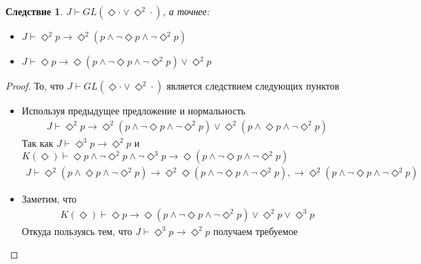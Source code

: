 \documentclass[12pt,a4paper,oneside]{article}
\newtheorem*{corollary}{Следствие}
\begin{document}
\begin{corollary}
$J \vdash  GL(\Diamond \cdot \vee  \Diamond ^2\cdot)$, а точнее:
\begin{itemize}
\item $J \vdash  \Diamond ^2 p \rightarrow  \Diamond ^2(p \wedge  \neg \Diamond p \wedge  \neg \Diamond ^2 p)$
\item $J \vdash  \Diamond  p \rightarrow  \Diamond (p \wedge  \neg \Diamond p \wedge  \neg \Diamond ^2 p) \vee  \Diamond ^2 p$
\end{itemize}
\end{corollary}
\begin{proof}
То, что $J \vdash  GL(\Diamond \cdot \vee  \Diamond ^2\cdot)$ является следствием следующих пунктов
\begin{itemize}
\item Используя предыдущее предложение и нормальность
\begin{align*}
J \vdash  \Diamond ^2 p \rightarrow  \Diamond ^2(p \wedge  \neg \Diamond p \wedge  \neg \Diamond ^2 p) \vee  \Diamond ^2(p \wedge  \Diamond p \wedge  \neg \Diamond ^2 p)
\end{align*}
Так как $J \vdash  \Diamond ^3 p \rightarrow  \Diamond ^2 p$ и $K(\Diamond ) \vdash  \Diamond p \wedge  \neg \Diamond ^2 p \wedge  \neg \Diamond ^3 p \rightarrow  \Diamond (p \wedge  \neg \Diamond p \wedge  \neg \Diamond ^2 p)$
\begin{align*}
J \vdash  \Diamond ^2(p \wedge  \Diamond p \wedge  \neg \Diamond ^2 p) \rightarrow  \Diamond ^2\Diamond (p \wedge  \neg \Diamond p \wedge  \neg \Diamond ^2 p), \rightarrow  \Diamond ^2(p \wedge  \neg \Diamond p \wedge  \neg \Diamond ^2 p)
\end{align*}
\item Заметим, что
\begin{align*}
K(\Diamond ) \vdash  \Diamond p \rightarrow  \Diamond (p \wedge  \neg \Diamond p \wedge  \neg \Diamond ^2 p) \vee  \Diamond ^2 p \vee  \Diamond ^3 p
\end{align*}
Откуда пользуясь тем, что $J \vdash  \Diamond ^3 p \rightarrow  \Diamond ^2 p$ получаем требуемое
\end{itemize}
\end{proof}
\end{document}
